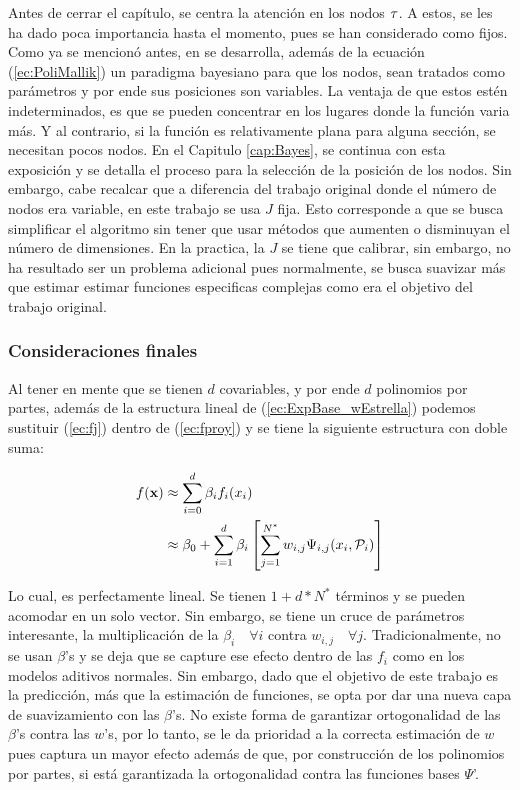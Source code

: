 \documentclass[../Main/Main.tex]{subfiles}
\begin{document}
Antes de cerrar el capítulo, se centra la atención en los nodos $\tau$. A estos, se les ha dado poca importancia hasta el momento, pues se han considerado como fijos. Como ya se mencionó antes, en \autocite{mallik1998automatic} se desarrolla, además de la ecuación (\ref{ec:PoliMallik}) un paradigma bayesiano para que los nodos, sean tratados como parámetros y por ende sus posiciones son variables. La ventaja de que estos estén indeterminados, es que se pueden concentrar en los lugares donde la función varia más. Y al contrario, si la función es relativamente plana para alguna sección, se necesitan pocos nodos. En el Capitulo \ref{cap:Bayes}, se continua con esta exposición y se detalla el proceso para la selección de la posición de los nodos. Sin embargo, cabe recalcar que a diferencia del trabajo original donde el número de nodos era variable, en este trabajo se usa $J$ fija. Esto corresponde a que se busca simplificar el algoritmo sin tener que usar métodos que aumenten o disminuyan el número de dimensiones. En la practica, la $J$ se tiene que calibrar, sin embargo, no ha resultado ser un problema adicional pues normalmente, se busca suavizar más que estimar estimar funciones especificas complejas como era el objetivo del trabajo original.

\subsubsection*{Consideraciones finales}

Al tener en mente que se tienen $d$ covariables, y por ende $d$ polinomios por partes, además de la estructura lineal de (\ref{ec:ExpBase_wEstrella}) podemos sustituir (\ref{ec:fj}) dentro de (\ref{ec:fproy}) y se tiene la siguiente estructura con doble suma:

\begin{align*}
	f(\mathbf{x}) &\approx \sum_{i=0}^d \beta_i f_i(x_i) \\
			&\approx \beta_0 + \sum_{i=1}^d \beta_i \left[\sum_{j=1}^{N^*} w_{i,j}\Psi_{i,j}(x_i, \mathcal{P}_i)\right]
\end{align*}

Lo cual, es perfectamente lineal. Se tienen $1 + d*N^*$ términos y se pueden acomodar en un solo vector. Sin embargo, se tiene un cruce de parámetros interesante, la multiplicación de la $\beta_i\quad \forall i$ contra $w_{i,j} \quad \forall j$. Tradicionalmente, no se usan $\beta$'s y se deja que se capture ese efecto dentro de las $f_i$ como en los modelos aditivos normales. Sin embargo, dado que el objetivo de este trabajo es la predicción, más que la estimación de funciones, se opta por dar una nueva capa de suavizamiento con las $\beta$'s. No existe forma de garantizar ortogonalidad de las $\beta$'s contra las $w$'s, por lo tanto, se le da prioridad a la correcta estimación de $w$ pues captura un mayor efecto además de que, por construcción de los polinomios por partes, si está garantizada la ortogonalidad contra las funciones bases $\Psi$'.
\end{document}
